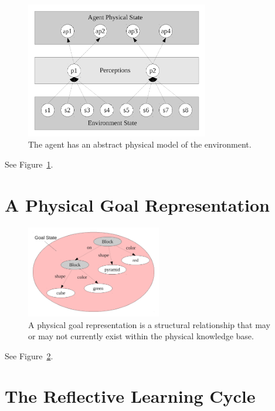 \begin{figure}[bth]
  \center
  \includegraphics[width=8cm]{gfx/environment_perception_physical}
  \caption[The agent has an abstract physical model of the
    environment]{The agent has an abstract physical model of the
    environment.}
  \label{fig:environment_perception_physical}
\end{figure}

See Figure~\ref{fig:environment_perception_physical}.


\section{A Physical Goal Representation}

\begin{figure}[bth]
  \center
  \includegraphics[height=4cm]{gfx/goal_state}
  \caption[A physical goal representation]{A physical goal
    representation is a structural relationship that may or may not
    currently exist within the physical knowledge base.}
  \label{fig:goal_state}
\end{figure}

See Figure~\ref{fig:goal_state}.


\section{The Reflective Learning Cycle}

